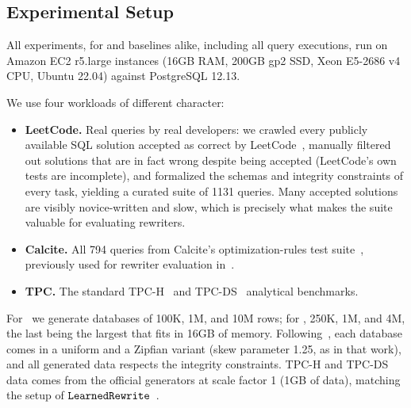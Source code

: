 \subsection{Experimental Setup}

All experiments, for \toolname and baselines alike, including all
query executions, run on Amazon EC2 r5.large instances (16GB RAM,
200GB gp2 SSD, Xeon E5-2686 v4 CPU, Ubuntu 22.04) against PostgreSQL
12.13.

We use four workloads of different character:

\begin{itemize}[leftmargin=*]
\item 
\textbf{LeetCode.}
Real queries by real developers: we crawled every publicly available
SQL solution accepted as correct by LeetCode~\cite{leetcode},
manually filtered out solutions that are in fact wrong despite being
accepted (LeetCode's own tests are incomplete), and formalized the
schemas and integrity constraints of every task, yielding a curated
suite of 1131 queries. Many accepted solutions are visibly
novice-written and slow, which is precisely what makes the suite
valuable for evaluating rewriters.

\item 
\textbf{Calcite.}
All 794 queries from Calcite's optimization-rules test
suite~\cite{calcite-test-suite}, previously used for rewriter
evaluation in~\cite{wetune}.

\item 
\textbf{TPC.}
The standard TPC-H~\cite{tpc-h} and TPC-DS~\cite{tpc-ds} analytical
benchmarks.

\end{itemize}


For \leetcode\ we generate databases of 100K, 1M, and 10M rows; for
\calcite, 250K, 1M, and 4M, the last being the largest that fits in
16GB of memory. Following~\cite{wetune}, each database comes in a
uniform and a Zipfian variant (skew parameter 1.25, as in that work),
and all generated data respects the integrity constraints. TPC-H and
TPC-DS data comes from the official generators at scale factor 1 (1GB
of data), matching the setup of $\texttt{LearnedRewrite}$~\cite{LR}.

